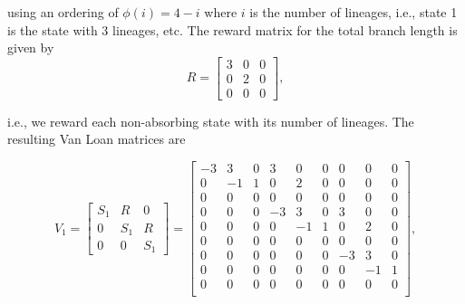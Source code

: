 \documentclass[hidelinks,11pt]{article}
\begin{document}
    using an ordering of $\phi(i) = 4-i$ where $i$ is the number of lineages, i.e., state 1 is the state with 3 lineages, etc.
    The reward matrix for the total branch length is given by
    \begin{equation*}
        R = \begin{bmatrix}
                3 & 0 & 0 \\ 0 & 2 & 0 \\ 0 & 0 & 0
        \end{bmatrix},
    \end{equation*}

    i.e., we reward each non-absorbing state with its number of lineages.
    The resulting Van Loan matrices are

    \begin{equation*}
        V_1 = \begin{bmatrix}
                  S_1 & R & 0 \\ 0 & S_1 & R \\ 0 & 0 & S_1
        \end{bmatrix} = \left [
            \begin{array}{ccc|ccc|ccc}
                -3 & 3  & 0 & 3  & 0  & 0 & 0  & 0  & 0 \\
                0  & -1 & 1 & 0  & 2  & 0 & 0  & 0  & 0 \\
                0  & 0  & 0 & 0  & 0  & 0 & 0  & 0  & 0 \\
                \hline
                0  & 0  & 0 & -3 & 3  & 0 & 3  & 0  & 0 \\
                0  & 0  & 0 & 0  & -1 & 1 & 0  & 2  & 0 \\
                0  & 0  & 0 & 0  & 0  & 0 & 0  & 0  & 0 \\
                \hline
                0  & 0  & 0 & 0  & 0  & 0 & -3 & 3  & 0 \\
                0  & 0  & 0 & 0  & 0  & 0 & 0  & -1 & 1 \\
                0  & 0  & 0 & 0  & 0  & 0 & 0  & 0  & 0 \\
            \end{array}
            \right ],
    \end{equation*}
\end{document}
